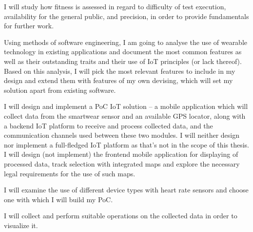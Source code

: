 I will study how fitness is assessed in regard to difficulty of test execution, availability for the general public, and precision, in order to provide fundamentals for further work.

Using methods of software engineering, I am going to analyse the use of wearable technology in existing applications and document the most common features as well as their outstanding traits and their use of IoT principles (or lack thereof).
Based on this analysis, I will pick the most relevant features to include in my design and extend them with features of my own devising, which will set my solution apart from existing software.

I will design and implement a PoC IoT solution -- a mobile application which will collect data from the smartwear sensor and an available GPS locator, along with a backend IoT platform to receive and process collected data, and the communication channels used between these two modules.
I will neither design nor implement a full-fledged IoT platform as that's not in the scope of this thesis.
I will design (not implement) the frontend mobile application for displaying of processed data, track selection with integrated maps and explore the necessary legal requirements for the use of such maps.

I will examine the use of different device types with heart rate sensors and choose one with which I will build my PoC.

I will collect and perform suitable operations on the collected data in order to visualize it.
